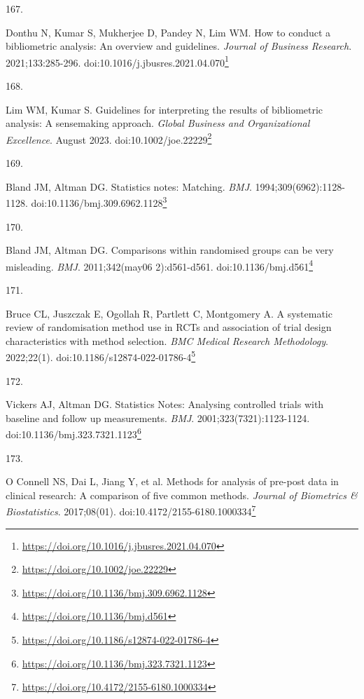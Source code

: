 \documentclass[
  a4paper,
]{book}
\newlength{\cslhangindent}
\newlength{\csllabelwidth}
\newlength{\cslentryspacingunit} %
\newenvironment{CSLReferences}[2] %
 {%
  \setlength{\parindent}{0pt}
  \ifodd #1
  \let\oldpar\par
  \def\par{\hangindent=\cslhangindent\oldpar}
  \fi
  \setlength{\parskip}{#2\cslentryspacingunit}
 }%
 {}
\newcommand{\CSLLeftMargin}[1]{\parbox[t]{\csllabelwidth}{#1}}
\newcommand{\CSLRightInline}[1]{\parbox[t]{\linewidth - \csllabelwidth}{#1}\break}
\renewcommand{\href}[2]{#2\footnote{\url{#1}}}
\begin{document}
\begin{CSLReferences}{0}{0}
\leavevmode{}%
\CSLLeftMargin{167. }%
\CSLRightInline{Donthu N, Kumar S, Mukherjee D, Pandey N, Lim WM. How to conduct a bibliometric analysis: An overview and guidelines. \emph{Journal of Business Research}. 2021;133:285-296. doi:\href{https://doi.org/10.1016/j.jbusres.2021.04.070}{10.1016/j.jbusres.2021.04.070}}

\leavevmode{}%
\CSLLeftMargin{168. }%
\CSLRightInline{Lim WM, Kumar S. Guidelines for interpreting the results of bibliometric analysis: A sensemaking approach. \emph{Global Business and Organizational Excellence}. August 2023. doi:\href{https://doi.org/10.1002/joe.22229}{10.1002/joe.22229}}

\leavevmode{}%
\CSLLeftMargin{169. }%
\CSLRightInline{Bland JM, Altman DG. Statistics notes: Matching. \emph{BMJ}. 1994;309(6962):1128-1128. doi:\href{https://doi.org/10.1136/bmj.309.6962.1128}{10.1136/bmj.309.6962.1128}}

\leavevmode{}%
\CSLLeftMargin{170. }%
\CSLRightInline{Bland JM, Altman DG. Comparisons within randomised groups can be very misleading. \emph{BMJ}. 2011;342(may06 2):d561-d561. doi:\href{https://doi.org/10.1136/bmj.d561}{10.1136/bmj.d561}}

\leavevmode{}%
\CSLLeftMargin{171. }%
\CSLRightInline{Bruce CL, Juszczak E, Ogollah R, Partlett C, Montgomery A. A systematic review of randomisation method use in RCTs and association of trial design characteristics with method selection. \emph{BMC Medical Research Methodology}. 2022;22(1). doi:\href{https://doi.org/10.1186/s12874-022-01786-4}{10.1186/s12874-022-01786-4}}

\leavevmode{}%
\CSLLeftMargin{172. }%
\CSLRightInline{Vickers AJ, Altman DG. Statistics Notes: Analysing controlled trials with baseline and follow up measurements. \emph{BMJ}. 2001;323(7321):1123-1124. doi:\href{https://doi.org/10.1136/bmj.323.7321.1123}{10.1136/bmj.323.7321.1123}}

\leavevmode{}%
\CSLLeftMargin{173. }%
\CSLRightInline{O Connell NS, Dai L, Jiang Y, et al. Methods for analysis of pre-post data in clinical research: A comparison of five common methods. \emph{Journal of Biometrics \& Biostatistics}. 2017;08(01). doi:\href{https://doi.org/10.4172/2155-6180.1000334}{10.4172/2155-6180.1000334}}


\end{CSLReferences}
\end{document}
